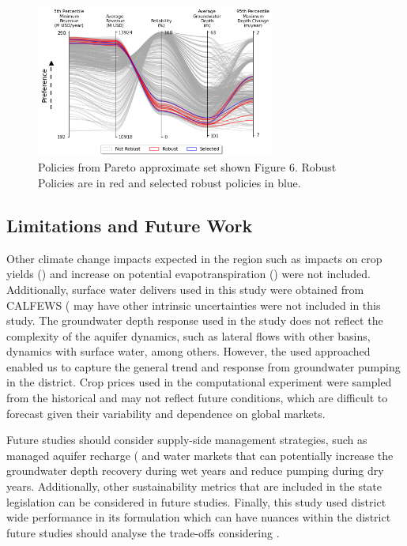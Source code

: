 \documentclass[11pt,a4paper]{article}
\begin{document}
\begin{figure}[H]
    \centering
    \includegraphics[width=0.7\textwidth]{robust_policies_parallel_axis.png}
    \caption{Policies from Pareto approximate set shown Figure 6. Robust Policies are in red and selected robust policies in blue.} \label{fig:parallel_robustness}
\end{figure}

\subsection{Limitations and Future Work}

Other climate change impacts expected in the region such as impacts on crop yields (\cite{blanc_is_2017}) and increase on potential evapotranspiration (\cite{vahmani_will_2022,mcevoy_projected_2020}) were not included. Additionally, surface water delivers used in this study were obtained from CALFEWS (\cite{zeff_californias_2021)} may have other intrinsic uncertainties were not included in this study. The groundwater depth response used in the study does not reflect the complexity of the aquifer dynamics, such as lateral flows with other basins, dynamics with surface water, among others. However, the used approached enabled us to capture the general trend and response from groundwater pumping in the district. Crop prices used in the computational experiment were sampled from the historical and may not reflect future conditions, which are difficult to forecast given their variability and dependence on global markets. 

Future studies should consider supply-side management strategies, such as managed aquifer recharge (\cite{alam} and water markets that can potentially increase the groundwater depth recovery during wet years and reduce pumping during dry years. Additionally, other sustainability metrics that are included in the state legislation can be considered in future studies. Finally, this study used district wide performance in its formulation which can have nuances within the district future studies should analyse the trade-offs considering .
 
\end{document}
